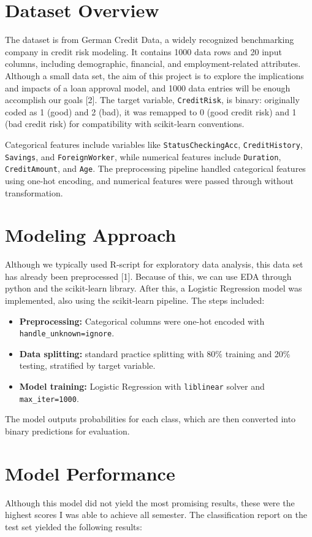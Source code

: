 \documentclass[12pt]{article}
\begin{document}
	\section{Dataset Overview}
	The dataset is from German Credit Data, a widely recognized benchmarking company in credit risk modeling. It contains 1000 data rows and 20 input columns, including demographic, financial, and employment-related attributes. Although a small data set, the aim of this project is to explore the implications and impacts of a loan approval model, and 1000 data entries will be enough accomplish our goals [2]. The target variable, \texttt{CreditRisk}, is binary: originally coded as 1 (good) and 2 (bad), it was remapped to 0 (good credit risk) and 1 (bad credit risk) for compatibility with scikit-learn conventions.
	
	Categorical features include variables like \texttt{StatusCheckingAcc}, \texttt{CreditHistory}, \texttt{Savings}, and \texttt{ForeignWorker}, while numerical features include \texttt{Duration}, \texttt{CreditAmount}, and \texttt{Age}. The preprocessing pipeline handled categorical features using one-hot encoding, and numerical features were passed through without transformation.
	
	\section{Modeling Approach}
	Although we typically used R-script for exploratory data analysis, this data set has already been preprocessed [1]. Because of this, we can use EDA through python and the scikit-learn library. After this, a Logistic Regression model was implemented, also using the scikit-learn pipeline. The steps included:
	\begin{itemize}
		\item \textbf{Preprocessing:} Categorical columns were one-hot encoded with \texttt{handle\_unknown=\textquotesingle ignore\textquotesingle}.
		\item \textbf{Data splitting:} standard practice splitting with 80\% training and 20\% testing, stratified by target variable.
		\item \textbf{Model training:} Logistic Regression with \texttt{liblinear} solver and \texttt{max\_iter=1000}.
	\end{itemize}
	
	The model outputs probabilities for each class, which are then converted into binary predictions for evaluation.
	
	\section{Model Performance}
	Although this model did not yield the most promising results, these were the highest scores I was able to achieve all semester. The classification report on the test set yielded the following results:
	
\end{document}
